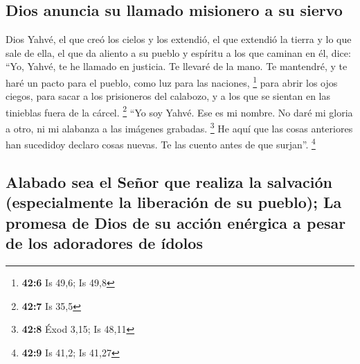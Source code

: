 \begin{paracol}{2}
\hypertarget{dios-anuncia-su-llamado-misionero-a-su-siervo}{%
\subsection{Dios anuncia su llamado misionero a su
siervo}\label{dios-anuncia-su-llamado-misionero-a-su-siervo}}

 Dios Yahvé, el que creó los cielos y los extendió, el que
extendió la tierra y lo que sale de ella, el que da aliento a su pueblo
y espíritu a los que caminan en él, dice:  ``Yo, Yahvé, te
he llamado en justicia. Te llevaré de la mano. Te mantendré, y te haré
un pacto para el pueblo, como luz para las naciones, \footnote{\textbf{42:6}
  Is 49,6; Is 49,8}  para abrir los ojos ciegos, para
sacar a los prisioneros del calabozo, y a los que se sientan en las
tinieblas fuera de la cárcel. \footnote{\textbf{42:7} Is 35,5}
 ``Yo soy Yahvé. Ese es mi nombre. No daré mi gloria a
otro, ni mi alabanza a las imágenes grabadas. \footnote{\textbf{42:8}
  Éxod 3,15; Is 48,11}  He aquí que las cosas anteriores
han sucedidoy declaro cosas nuevas. Te las cuento antes de que surjan''.
\footnote{\textbf{42:9} Is 41,2; Is 41,27}

\hypertarget{alabado-sea-el-seuxf1or-que-realiza-la-salvaciuxf3n-especialmente-la-liberaciuxf3n-de-su-pueblo-la-promesa-de-dios-de-su-acciuxf3n-enuxe9rgica-a-pesar-de-los-adoradores-de-uxeddolos}{%
\subsection{Alabado sea el Señor que realiza la salvación (especialmente
la liberación de su pueblo); La promesa de Dios de su acción enérgica a
pesar de los adoradores de
ídolos}\label{alabado-sea-el-seuxf1or-que-realiza-la-salvaciuxf3n-especialmente-la-liberaciuxf3n-de-su-pueblo-la-promesa-de-dios-de-su-acciuxf3n-enuxe9rgica-a-pesar-de-los-adoradores-de-uxeddolos}}


\end{paracol}
